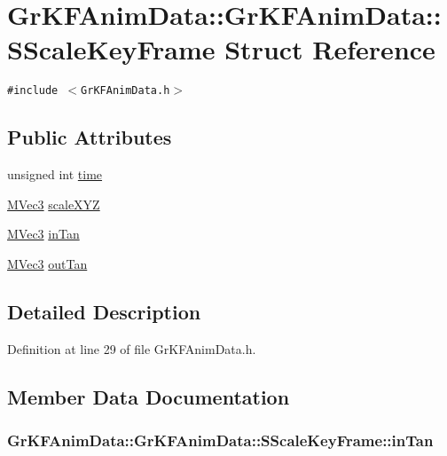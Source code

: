 \hypertarget{struct_gr_k_f_anim_data_1_1_s_scale_key_frame}{
\section{GrKFAnimData::GrKFAnimData::SScaleKeyFrame Struct Reference}
\label{struct_gr_k_f_anim_data_1_1_s_scale_key_frame}
}
{\tt \#include $<$GrKFAnimData.h$>$}

\subsection*{Public Attributes}
\begin{CompactItemize}
\item 
unsigned int \hyperlink{struct_gr_k_f_anim_data_1_1_s_scale_key_frame_140965e423cda2172248141f124ef7f7}{time}
\item 
\hyperlink{class_m_vec3}{MVec3} \hyperlink{struct_gr_k_f_anim_data_1_1_s_scale_key_frame_c00812c1d3e2194a2bee92f449109738}{scaleXYZ}
\item 
\hyperlink{class_m_vec3}{MVec3} \hyperlink{struct_gr_k_f_anim_data_1_1_s_scale_key_frame_3c7aac2fa3374c91da6fba472d6a4f4b}{inTan}
\item 
\hyperlink{class_m_vec3}{MVec3} \hyperlink{struct_gr_k_f_anim_data_1_1_s_scale_key_frame_772af69bbc1d28d93b6dde176e274919}{outTan}
\end{CompactItemize}


\subsection{Detailed Description}


Definition at line 29 of file GrKFAnimData.h.

\subsection{Member Data Documentation}
\hypertarget{struct_gr_k_f_anim_data_1_1_s_scale_key_frame_3c7aac2fa3374c91da6fba472d6a4f4b}{
\subsubsection[{inTan}]{ GrKFAnimData::GrKFAnimData::SScaleKeyFrame::inTan}}
\label{struct_gr_k_f_anim_data_1_1_s_scale_key_frame_3c7aac2fa3374c91da6fba472d6a4f4b}




